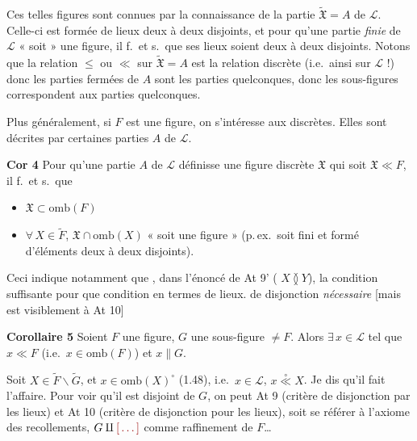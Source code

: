 \documentclass[11pt,a4paper]{article}
\begin{document}
\struck{\ill{}} Ces telles figures sont connues  par la connaissance de la partie $\widetilde{\mathfrak{X}} = A$ de $\mathcal{L}$. Celle-ci est formée de lieux deux à deux disjoints, et pour qu'une partie \emph{finie} de $\mathcal{L}$ « soit » une figure, il f.\ et s.\ que ses lieux soient deux à deux  disjoints. \struck{\ill{}} Notons que la relation $\leq$ ou $\ll$ sur $\widetilde{\mathfrak{X}} = A$ est la relation discrète (i.e.\ ainsi sur $\mathcal{L}$ !) donc les parties fermées de $A$ sont les parties quelconques, donc les sous-figures correspondent aux parties quelconques.

Plus généralement, si $F$ est une figure, on s'intéresse aux  discrètes. Elles sont décrites par certaines \struck{\ill{}} parties $A$ de $\mathcal{L}$.

\textbf{Cor 4}  Pour qu'une partie $A$ de $\mathcal{L}$ définisse une figure discrète $\mathfrak{X}$  qui soit $\mathfrak{X} \ll F$, il f.\ et s.\ que
\begin{itemize}
  \item[(i)] $\mathfrak{X} \subset \mathrm{omb}(F)$
  \item[(ii)] $\forall\, X \in \widetilde{F}$, $\mathfrak{X} \cap \mathrm{omb}(X)$ « soit une figure » (p.\,ex.\ soit fini et formé d'éléments deux à deux disjoints).
\end{itemize}

Ceci indique notamment que \ill{} \ill{}, dans l'énoncé de At 9' (\ill{} $X \between Y$), la condition suffisante pour que \ill{} condition \ill{} en termes de lieux. \ill{} \ill{} de disjonction \emph{nécessaire} [mais est visiblement  à At 10]

\textbf{Corollaire 5} Soient $F$ une figure, $G$ une sous-figure $\neq F$. Alors $\exists\, x \in \mathcal{L}$ tel que $x \ll F$ (i.e.\ $x \in \mathrm{omb}(F)$) et $x \parallel G$.

Soit $X \in \widetilde{F} \smallsetminus \widetilde{G}$, et $x \in \mathrm{omb}(X)^{\circ}$ (1.48), i.e.\ $x \in \mathcal{L}$, $x \overset{\circ}{\ll} X$. Je dis qu'il fait l'affaire. Pour voir qu'il est disjoint de $G$, on peut   At 9 (critère de disjonction par les lieux) et At 10 (critère de disjonction pour les lieux), soit se référer à \struck{\ill{}} l'axiome des recollements,  $G \amalg \ill{}$ comme raffinement de $F$\ldots
{}
\end{document}
